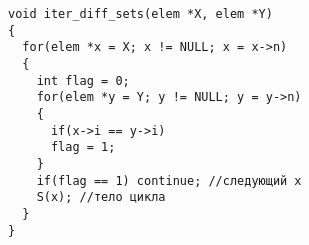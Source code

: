\documentclass[a5paper]{article}
\begin{document}

\begin{lstlisting}
void iter_diff_sets(elem *X, elem *Y)
{
  for(elem *x = X; x != NULL; x = x->n)
  {
    int flag = 0;
    for(elem *y = Y; y != NULL; y = y->n)
    {
      if(x->i == y->i)
      flag = 1;
    }
    if(flag == 1) continue; //следующий x
    S(x); //тело цикла
  }
}
\end{lstlisting}
\end{document}
